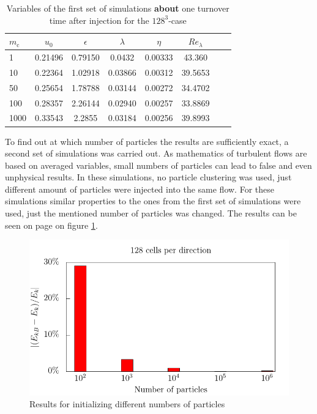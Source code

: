 \documentclass[11pt,a4paper,openany,oneside,parskip=half*]{article}
\begin{document}
\begin{table}[h]
\begin{center}
\begin{tabular}{l | c c c c c c c }
$m_\mathrm{c}$ & $u_0$ & $\epsilon$ & $\lambda$ & $\eta $ & $Re_\lambda$ \\
\hline
\hline
1 & 0.21496 & 0.79150 & 0.0432 & 0.00333 & 43.360  \\
10 & 0.22364 & 1.02918 & 0.03866 & 0.00312 & 39.5653 \\
50 & 0.25654 & 1.78788 & 0.03144 & 0.00272 & 34.4702   \\
100 & 0.28357 & 2.26144 & 0.02940 & 0.00257 & 33.8869 \\
1000 & 0.33543 & 2.2855 & 0.03184 & 0.00256 & 39.8993   \\
\hline
\end{tabular}
\caption{Variables of the first set of simulations \textbf{about} one turnover time after injection for the $128^3$-case}
\label{table_properties}
\end{center}
\end{table}
\newline
To find out at which number of particles the results are sufficiently exact, a second set of simulations was carried out. As mathematics of turbulent flows are based on averaged variables, small numbers of particles can lead to false and even unphysical results. In these simulations, no particle clustering was used, just different amount of particles were injected into the same flow. For these simulations similar properties to the ones from the first set of simulations were used, just the mentioned number of particles was changed. The results can be seen on page \pageref{kineticEnergy_numberOfParticles} on figure \ref{kineticEnergy_numberOfParticles}. 
\begin{figure}[h]
	\centering
  \includegraphics[width=\textwidth]{./../Simulationsergebnisse/variationPartikelAnzahl/128/kineticEnergy_numberOfParticles.pdf}
	\caption{Results for initializing different numbers of particles}
	\label{kineticEnergy_numberOfParticles}
\end{figure}
\end{document}
